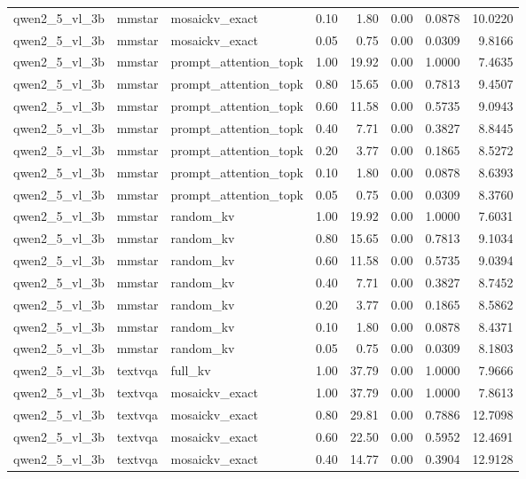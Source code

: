 \begin{longtable}{lllrrrrr}
qwen2\_5\_vl\_3b & mmstar & mosaickv\_exact & 0.10 & 1.80 & 0.00 & 0.0878 & 10.0220 \\
qwen2\_5\_vl\_3b & mmstar & mosaickv\_exact & 0.05 & 0.75 & 0.00 & 0.0309 & 9.8166 \\
qwen2\_5\_vl\_3b & mmstar & prompt\_attention\_topk & 1.00 & 19.92 & 0.00 & 1.0000 & 7.4635 \\
qwen2\_5\_vl\_3b & mmstar & prompt\_attention\_topk & 0.80 & 15.65 & 0.00 & 0.7813 & 9.4507 \\
qwen2\_5\_vl\_3b & mmstar & prompt\_attention\_topk & 0.60 & 11.58 & 0.00 & 0.5735 & 9.0943 \\
qwen2\_5\_vl\_3b & mmstar & prompt\_attention\_topk & 0.40 & 7.71 & 0.00 & 0.3827 & 8.8445 \\
qwen2\_5\_vl\_3b & mmstar & prompt\_attention\_topk & 0.20 & 3.77 & 0.00 & 0.1865 & 8.5272 \\
qwen2\_5\_vl\_3b & mmstar & prompt\_attention\_topk & 0.10 & 1.80 & 0.00 & 0.0878 & 8.6393 \\
qwen2\_5\_vl\_3b & mmstar & prompt\_attention\_topk & 0.05 & 0.75 & 0.00 & 0.0309 & 8.3760 \\
qwen2\_5\_vl\_3b & mmstar & random\_kv & 1.00 & 19.92 & 0.00 & 1.0000 & 7.6031 \\
qwen2\_5\_vl\_3b & mmstar & random\_kv & 0.80 & 15.65 & 0.00 & 0.7813 & 9.1034 \\
qwen2\_5\_vl\_3b & mmstar & random\_kv & 0.60 & 11.58 & 0.00 & 0.5735 & 9.0394 \\
qwen2\_5\_vl\_3b & mmstar & random\_kv & 0.40 & 7.71 & 0.00 & 0.3827 & 8.7452 \\
qwen2\_5\_vl\_3b & mmstar & random\_kv & 0.20 & 3.77 & 0.00 & 0.1865 & 8.5862 \\
qwen2\_5\_vl\_3b & mmstar & random\_kv & 0.10 & 1.80 & 0.00 & 0.0878 & 8.4371 \\
qwen2\_5\_vl\_3b & mmstar & random\_kv & 0.05 & 0.75 & 0.00 & 0.0309 & 8.1803 \\
qwen2\_5\_vl\_3b & textvqa & full\_kv & 1.00 & 37.79 & 0.00 & 1.0000 & 7.9666 \\
qwen2\_5\_vl\_3b & textvqa & mosaickv\_exact & 1.00 & 37.79 & 0.00 & 1.0000 & 7.8613 \\
qwen2\_5\_vl\_3b & textvqa & mosaickv\_exact & 0.80 & 29.81 & 0.00 & 0.7886 & 12.7098 \\
qwen2\_5\_vl\_3b & textvqa & mosaickv\_exact & 0.60 & 22.50 & 0.00 & 0.5952 & 12.4691 \\
qwen2\_5\_vl\_3b & textvqa & mosaickv\_exact & 0.40 & 14.77 & 0.00 & 0.3904 & 12.9128 \\

\end{longtable}
